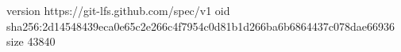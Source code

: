 version https://git-lfs.github.com/spec/v1
oid sha256:2d14548439eca0e65c2e266c4f7954c0d81b1d266ba6b6864437c078dae66936
size 43840
